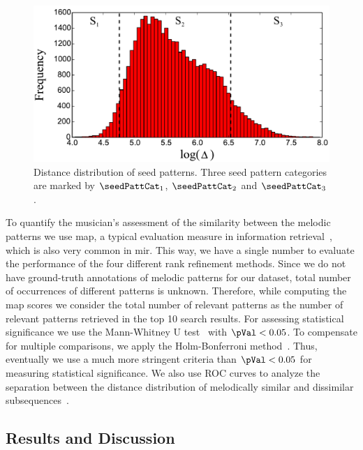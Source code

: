 \begin{figure}
	\begin{center}
		\includegraphics[width=\figSizeEightyFive]{ch06_patterns/figures/discovery/SeedDistribution.pdf}
	\end{center}
	\caption[Distance distribution of seed melodic patterns]{Distance distribution of seed patterns. Three seed pattern categories are marked by $\seedPattCat_1$, $\seedPattCat_2$ and $\seedPattCat_3$.}
	\label{fig:SeedPatternsDistanceDistribution}
\end{figure}


To quantify the musician's assessment of the similarity between the melodic patterns  we use \gls{map}, a typical evaluation measure in information retrieval~\citep{manning2008introduction}, which is also very common in \gls{mir}. This way, we have a single number to evaluate the performance of the four different rank refinement methods. Since we do not have ground-truth annotations of melodic patterns for our dataset, total number of occurrences of different patterns is unknown. Therefore, while computing the \gls{map} scores we consider the total number of relevant patterns as the number of relevant patterns retrieved in the top 10 search results.  For assessing statistical significance we use the Mann-Whitney U test~\citep{mann1947test} with $\pVal < 0.05$. To compensate for multiple comparisons, we apply the Holm-Bonferroni method~\citep{holm1979simple}. Thus, eventually we use a much more stringent criteria than $\pVal < 0.05$ for measuring statistical significance. We also use ROC curves to analyze the separation between the distance distribution of melodically similar and dissimilar subsequences~\citep{manning2008introduction}. 


\subsection{Results and Discussion}
\label{sec:patterns_discovery_results}

